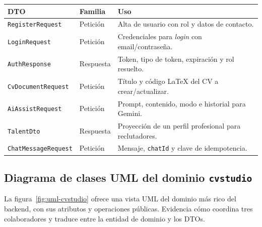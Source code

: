 \vspace{0.2cm}
\noindent
\renewcommand{\arraystretch}{1.3}
\fontsize{8.5}{10.2}\selectfont\sffamily
\begin{tabularx}{\textwidth}{|L{4.2cm}|C{1.8cm}|Y|}
\hline
{}
\sffamily\textbf{DTO} & \sffamily\textbf{Familia} & \sffamily\textbf{Uso} \\
\hline
\texttt{RegisterRequest} & Petición & Alta de usuario con rol y datos de contacto. \\ \hline
{}
\texttt{LoginRequest} & Petición & Credenciales para \textit{login} con email/contraseña. \\ \hline
\texttt{AuthResponse} & Respuesta & Token, tipo de token, expiración y rol resuelto. \\ \hline
{}
\texttt{CvDocumentRequest} & Petición & Título y código LaTeX del CV a crear/actualizar. \\ \hline
\texttt{AiAssistRequest} & Petición & Prompt, contenido, modo e historial para Gemini. \\ \hline
{}
\texttt{TalentDto} & Respuesta & Proyección de un perfil profesional para reclutadores. \\ \hline
\texttt{ChatMessageRequest} & Petición & Mensaje, \texttt{chatId} y clave de idempotencia. \\ \hline
\end{tabularx}
\label{tab:dtos}

\subsection{Diagrama de clases UML del dominio \texttt{cvstudio}}
\label{subsec:uml_cvstudio}

La figura~\ref{fig:uml-cvstudio} ofrece una vista UML del dominio más rico del backend,
con sus atributos y operaciones públicas. Evidencia cómo 
coordina tres colaboradores y traduce entre la entidad de dominio y los DTOs.

